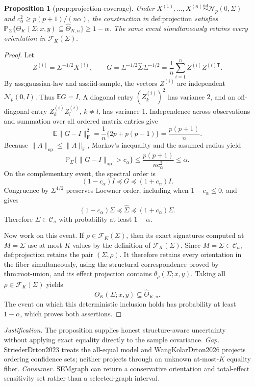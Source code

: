 \documentclass{article}
\newtheorem{proposition}{Proposition}
\begin{document}
\begin{proposition}[prop:projection-coverage]\label{prop:projection-coverage}
Under \(X^{(1)},\ldots,X^{(n)}\stackrel{\mathrm{iid}}{\sim}\mathcal N_p(0,\Sigma)\) and \(c_\alpha^2\ge p(p+1)/(n\alpha)\), the construction in \(\text{def:projection}\) satisfies \(\mathbb P_\Sigma\{\Theta_K(\Sigma;x,y)\subseteq\widehat\Theta_{K,n}\}\ge1-\alpha\). The same event simultaneously retains every orientation in \(\mathcal F_K(\Sigma)\).
\end{proposition}
\begin{proof}
Let
\[
 Z^{(i)}=\Sigma^{-1/2}X^{(i)},
 \qquad
 G=\Sigma^{-1/2}\widehat\Sigma\Sigma^{-1/2}
 =\frac1n\sum_{i=1}^{n}Z^{(i)}Z^{(i)\mathsf T}.
\]
By \(\text{ass:gaussian-law}\) and \(\text{ass:iid-sample}\), the vectors \(Z^{(i)}\) are independent \(\mathcal N_p(0,I)\).  Thus \(\mathbb E G=I\).  A diagonal entry \((Z_k^{(i)})^2\) has variance \(2\), and an off-diagonal entry \(Z_k^{(i)}Z_l^{(i)}\), \(k\ne l\), has variance \(1\).  Independence across observations and summation over all ordered matrix entries give
\[
 \mathbb E\|G-I\|_{\mathrm F}^{2}
 =\frac1n\{2p+p(p-1)\}
 =\frac{p(p+1)}{n}.
\]
Because \(\|A\|_{\mathrm{op}}\le\|A\|_{\mathrm F}\), Markov's inequality and the assumed radius yield
\[
 \mathbb P_\Sigma\{\|G-I\|_{\mathrm{op}}>c_\alpha\}
 \le\frac{p(p+1)}{nc_\alpha^2}\le\alpha.
\]
On the complementary event, the spectral order is
\[
 (1-c_\alpha)I\preceq G\preceq(1+c_\alpha)I.
\]
Congruence by \(\Sigma^{1/2}\) preserves Loewner order, including when \(1-c_\alpha\le0\), and gives
\[
 (1-c_\alpha)\Sigma\preceq\widehat\Sigma
 \preceq(1+c_\alpha)\Sigma.
\]
Therefore \(\Sigma\in\mathcal C_n\) with probability at least \(1-\alpha\).

Now work on this event.  If \(\rho\in\mathcal F_K(\Sigma)\), then its exact signatures computed at \(M=\Sigma\) use at most \(K\) values by the definition of \(\mathcal F_K(\Sigma)\).  Since \(M=\Sigma\in\mathcal C_n\), \(\text{def:projection}\) retains the pair \((\Sigma,\rho)\).  It therefore retains every orientation in the fiber simultaneously, using the structural correspondence proved by \(\text{thm:root-union}\), and its effect projection contains \(\theta_\rho(\Sigma;x,y)\).  Taking all \(\rho\in\mathcal F_K(\Sigma)\) yields
\[
 \Theta_K(\Sigma;x,y)\subseteq\widehat\Theta_{K,n}.
\]
The event on which this deterministic inclusion holds has probability at least \(1-\alpha\), which proves both assertions.
\end{proof}
\par\smallskip\noindent \textit{Justification.} The proposition supplies honest structure-aware uncertainty without applying exact equality directly to the sample covariance. \textit{Gap.} StriederDrton2023 treats the all-equal model and WangKolarDrton2026 projects ordering confidence sets; neither projects through an unknown at-most-\(K\) equality fiber. \textit{Consumer.} SEMgraph can return a conservative orientation and total-effect sensitivity set rather than a selected-graph interval.
\end{document}
